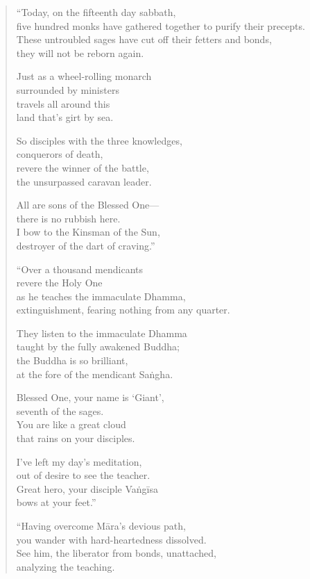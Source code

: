 \documentclass[12pt,openany]{book}%
\begin{document}
\begin{verse}
“Today, on the fifteenth day sabbath, \\
five hundred monks have gathered together to purify their precepts. \\
These untroubled sages have cut off their fetters and bonds, \\
they will not be reborn again. 

Just as a wheel-rolling monarch \\
surrounded by ministers \\
travels all around this \\
land that’s girt by sea. 

So disciples with the three knowledges, \\
conquerors of death, \\
revere the winner of the battle, \\
the unsurpassed caravan leader. 

All are sons of the Blessed One—\\
there is no rubbish here. \\
I bow to the Kinsman of the Sun, \\
destroyer of the dart of craving.” 

“Over a thousand mendicants \\
revere the Holy One \\
as he teaches the immaculate Dhamma, \\
extinguishment, fearing nothing from any quarter. 

They listen to the immaculate Dhamma \\
taught by the fully awakened Buddha; \\
the Buddha is so brilliant, \\
at the fore of the mendicant \textsanskrit{Saṅgha}. 

Blessed One, your name is ‘Giant’, \\
seventh of the sages. \\
You are like a great cloud \\
that rains on your disciples. 

I’ve left my day’s meditation, \\
out of desire to see the teacher. \\
Great hero, your disciple \textsanskrit{Vaṅgīsa} \\
bows at your feet.” 

“Having overcome \textsanskrit{Māra}’s devious path, \\
you wander with hard-heartedness dissolved. \\
See him, the liberator from bonds, unattached, \\
analyzing the teaching. 


\end{verse}
\end{document}
